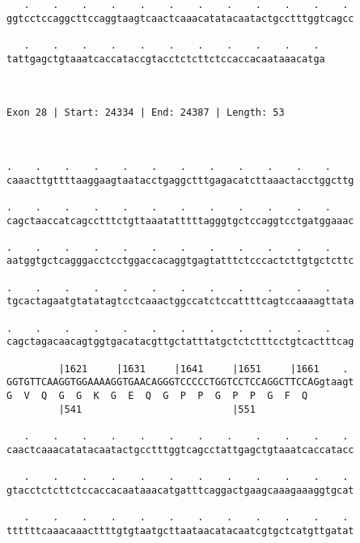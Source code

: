 \documentclass{article}
\begin{document}
\begin{Verbatim}
   .    .    .    .    .    .    .    .    .    .    .    . 
ggtcctccaggcttccaggtaagtcaactcaaacatatacaatactgcctttggtcagcc
                                                            
   .    .    .    .    .    .    .    .    .    .    . 
tattgagctgtaaatcaccataccgtacctctcttctccaccacaataaacatga
                                                       
                                                       
 
Exon 28 | Start: 24334 | End: 24387 | Length: 53



.    .    .    .    .    .    .    .    .    .    .    .    
caaacttgttttaaggaagtaatacctgaggctttgagacatcttaaactacctggcttg
                                                            
.    .    .    .    .    .    .    .    .    .    .    .    
cagctaaccatcagcctttctgttaaatatttttagggtgctccaggtcctgatggaaac
                                                            
.    .    .    .    .    .    .    .    .    .    .    .    
aatggtgctcagggacctcctggaccacaggtgagtatttctcccactcttgtgctcttc
                                                            
.    .    .    .    .    .    .    .    .    .    .    .    
tgcactagaatgtatatagtcctcaaactggccatctccattttcagtccaaaagttata
                                                            
.    .    .    .    .    .    .    .    .    .    .    .    
cagctagacaacagtggtgacatacgttgctatttatgctctctttcctgtcactttcag
                                                            
         |1621     |1631     |1641     |1651     |1661    . 
GGTGTTCAAGGTGGAAAAGGTGAACAGGGTCCCCCTGGTCCTCCAGGCTTCCAGgtaagt
G  V  Q  G  G  K  G  E  Q  G  P  P  G  P  P  G  F  Q        
         |541                          |551                 
  
   .    .    .    .    .    .    .    .    .    .    .    . 
caactcaaacatatacaatactgcctttggtcagcctattgagctgtaaatcaccatacc
                                                            
   .    .    .    .    .    .    .    .    .    .    .    . 
gtacctctcttctccaccacaataaacatgatttcaggactgaagcaaagaaaggtgcat
                                                            
   .    .    .    .    .    .    .    .    .    .    .    . 
ttttttcaaacaaacttttgtgtaatgcttaataacatacaatcgtgctcatgttgatat
                                                            

\end{Verbatim}
\end{document}
